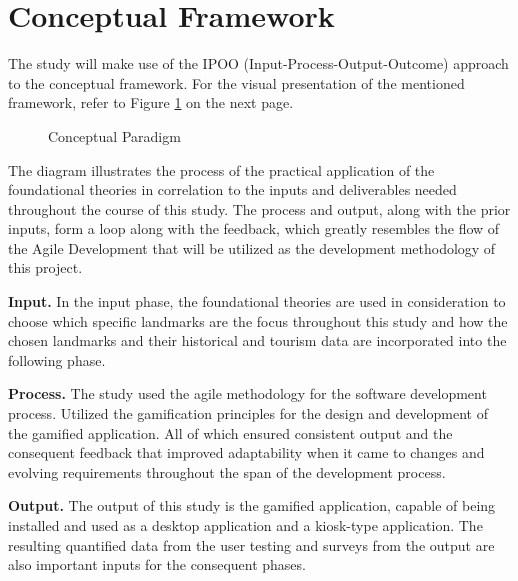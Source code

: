 \documentclass{research}
\begin{document}
\section{Conceptual Framework}

The study will make use of the IPOO (Input-Process-Output-Outcome) approach to the
conceptual framework. For the visual presentation of the mentioned framework, refer to
Figure \ref{fig:conceptual_paradigm} on the next page.

\begin{figure}[h!]
  \centering
  \caption{Conceptual Paradigm}
  \label{fig:conceptual_paradigm}
\end{figure}

The diagram illustrates the process of the practical application of the foundational
theories in correlation to the inputs and deliverables needed throughout the course of
this study. The process and output, along with the prior inputs, form a loop along with
the feedback, which greatly resembles the flow of the Agile Development that will be
utilized as the development methodology of this project.

\textbf{Input.} In the input phase, the foundational theories are used in consideration
to choose which specific landmarks are the focus throughout this study and how the
chosen landmarks and their historical and tourism data are incorporated into the
following phase.

\textbf{Process.} The study used the agile methodology for the software development
process. Utilized the gamification principles for the design and development of the
gamified application. All of which ensured consistent output and the consequent feedback
that improved adaptability when it came to changes and evolving requirements throughout
the span of the development process.

\textbf{Output.} The output of this study is the gamified application, capable of
being installed and used as a desktop application and a kiosk-type application. The
resulting quantified data from the user testing and surveys from the output are also
important inputs for the consequent phases.
\end{document}
